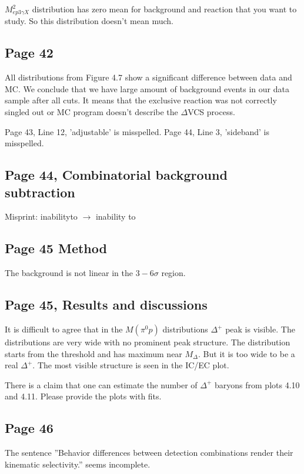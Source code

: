 \documentclass[11pt]{paper}
\begin{document}
$M^2_{ep3\gamma X}$ distribution has zero mean for background and reaction that you want to study. So this distribution doesn't mean much.
  
\subsection*{Page 42}

All distributions from Figure 4.7 show a significant difference between data and MC. 
We conclude that we have large amount of background events in our data sample after all cuts.  
It means that the exclusive reaction was not correctly singled out or MC program doesn't describe the $\Delta$VCS process. 

Page 43, Line 12, 'adjustable' is misspelled.
Page 44, Line 3, 'sideband' is misspelled.


\subsection*{Page 44, Combinatorial background subtraction}
Misprint: inabilityto $\rightarrow$ inability to

\subsection*{Page 45 Method}

The background is not linear in the $3-6\sigma$ region.

\subsection*{Page 45, Results and discussions}
It is difficult to agree that in the $M(\pi^0p)$ distributions $\Delta^+$ peak is visible. 
The distributions are very wide with no prominent peak structure. 
The distribution starts from the threshold and has maximum near  $M_\Delta$. But it is too wide to be a real $\Delta^+$. The most visible structure is seen in the IC/EC plot.

There is a claim that one can estimate the number of $\Delta^+$ baryons from plots 4.10 and 4.11.
Please provide the plots with fits.

\subsection*{Page 46}
The sentence ''Behavior differences between detection combinations render their kinematic selectivity.'' seems incomplete.
\end{document}
